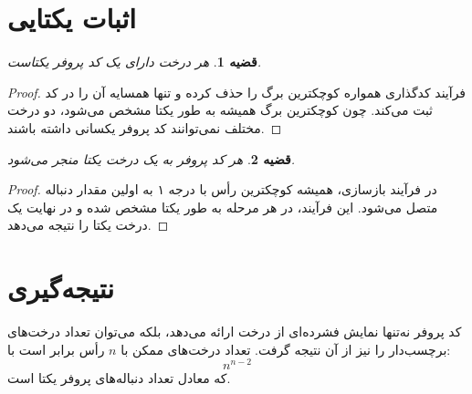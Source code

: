 \documentclass{article}
\newtheorem{theorem}{قضیه}
\begin{document}
	\section{اثبات یکتایی}
	\begin{theorem}
		هر درخت دارای یک کد پروفر یکتاست.
	\end{theorem}
	\begin{proof}
		فرآیند کدگذاری همواره کوچکترین برگ را حذف کرده و تنها همسایه آن را در کد ثبت می‌کند. چون کوچکترین برگ همیشه به طور یکتا مشخص می‌شود، دو درخت مختلف نمی‌توانند کد پروفر یکسانی داشته باشند.
	\end{proof}
	
	\begin{theorem}
		هر کد پروفر به یک درخت یکتا منجر می‌شود.
	\end{theorem}
	\begin{proof}
		در فرآیند بازسازی، همیشه کوچکترین رأس با درجه ۱ به اولین مقدار دنباله متصل می‌شود. این فرآیند، در هر مرحله به طور یکتا مشخص شده و در نهایت یک درخت یکتا را نتیجه می‌دهد.
	\end{proof}
	
	\section{نتیجه‌گیری}
	کد پروفر نه‌تنها نمایش فشرده‌ای از درخت ارائه می‌دهد، بلکه می‌توان تعداد درخت‌های برچسب‌دار را نیز از آن نتیجه گرفت. تعداد درخت‌های ممکن با $n$ رأس برابر است با:
	\[
	n^{n-2}
	\]
	که معادل تعداد دنباله‌های پروفر یکتا است.
\end{document}
